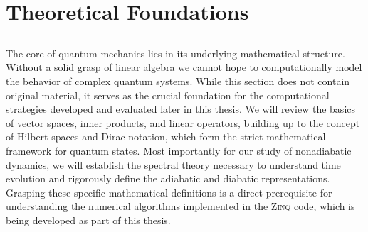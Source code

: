 \part{Theoretical Foundations}
\chapter{\foldertotitle}\label{chp:mathematical_background}
The core of quantum mechanics lies in its underlying mathematical structure. Without a solid grasp of linear algebra we cannot hope to computationally model the behavior of complex quantum systems. While this section does not contain original material, it serves as the crucial foundation for the computational strategies developed and evaluated later in this thesis. We will review the basics of vector spaces, inner products, and linear operators, building up to the concept of Hilbert spaces and Dirac notation, which form the strict mathematical framework for quantum states. Most importantly for our study of nonadiabatic dynamics, we will establish the spectral theory necessary to understand time evolution and rigorously define the adiabatic and diabatic representations. Grasping these specific mathematical definitions is a direct prerequisite for understanding the numerical algorithms implemented in the \textsc{Zinq} code, which is being developed as part of this thesis.\supercite{10.5281/zenodo.18386143}
